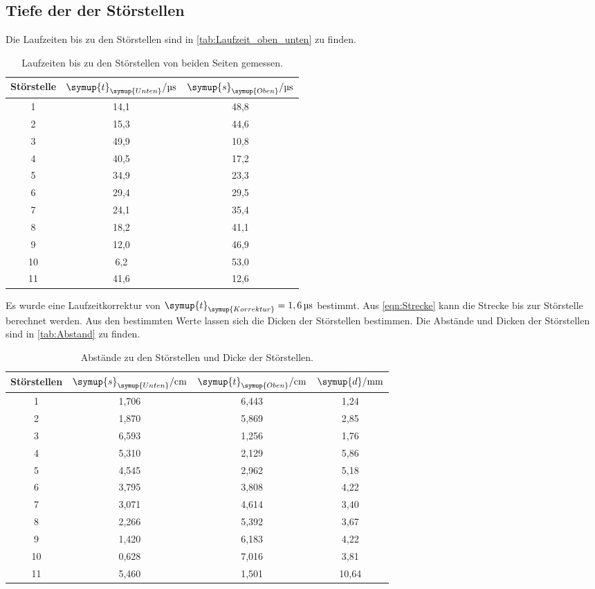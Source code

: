 \subsection{Tiefe der der Störstellen}
\label{sec:Tiefe}
Die Laufzeiten bis zu den Störstellen sind in \autoref{tab:Laufzeit_oben_unten} zu finden.
\begin{table}
  \centering
  \begin{tabular}{c c c }
    \toprule
    Störstelle & $\symup{t}_{\symup{Unten}}/\unit{\micro\second}$ & $\symup{s}_{\symup{Oben}}/\unit{\micro\second}$\\
    \midrule
     1 & 14,1 & 48,8 \\
     2 & 15,3 & 44,6 \\
     3 & 49,9 & 10,8 \\
     4 & 40,5 & 17,2 \\
     5 & 34,9 & 23,3 \\
     6 & 29,4 & 29,5 \\
     7 & 24,1 & 35,4 \\
     8 & 18,2 & 41,1 \\
     9 & 12,0 & 46,9 \\
    10 &  6,2 & 53,0 \\
    11 & 41,6 & 12,6 \\
    \bottomrule
  \end{tabular}
  \caption{Laufzeiten bis zu den Störstellen von beiden Seiten gemessen.}
  \label{tab:Laufzeit_oben_unten}
\end{table}
Es wurde eine Laufzeitkorrektur von $\symup{t}_{\symup{Korrektur}} = 1,6\,\unit{\micro\second}$ bestimmt.
Aus \autoref{eqn:Strecke} kann die Strecke bis zur Störstelle berechnet werden. Aus den bestimmten Werte lassen sich
die Dicken der Störstellen bestimmen. Die Abstände und Dicken der Störstellen sind in \autoref{tab:Abstand} zu finden.
\begin{table}
  \centering
  \begin{tabular}{c c c c}
    \toprule
    Störstellen & $\symup{s}_{\symup{Unten}}/\unit{\centi\meter}$ & $\symup{t}_{\symup{Oben}}/\unit{\centi\meter}$ & $\symup{d}/\unit{\milli\meter}$ \\
    \midrule
     1 & 1,706 & 6,443 &  1,24 \\
     2 & 1,870 & 5,869 &  2,85 \\
     3 & 6,593 & 1,256 &  1,76 \\
     4 & 5,310 & 2,129 &  5,86 \\
     5 & 4,545 & 2,962 &  5,18 \\
     6 & 3,795 & 3,808 &  4,22 \\
     7 & 3,071 & 4,614 &  3,40 \\
     8 & 2,266 & 5,392 &  3,67 \\
     9 & 1,420 & 6,183 &  4,22 \\
    10 & 0,628 & 7,016 &  3,81 \\
    11 & 5,460 & 1,501 & 10,64 \\
    \bottomrule
  \end{tabular}
  \caption{Abstände zu den Störstellen und Dicke der Störstellen.}
  \label{tab:Abstand}
\end{table}